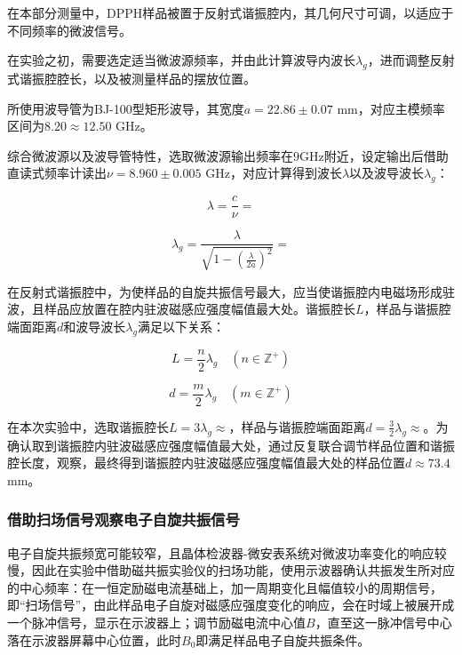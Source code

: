 \documentclass{thuemp}
\begin{document}
在本部分测量中，DPPH样品被置于反射式谐振腔内，其几何尺寸可调，以适应于不同频率的微波信号。

在实验之初，需要选定适当微波源频率，并由此计算波导内波长$\lambda_g$，进而调整反射式谐振腔腔长，以及被测量样品的摆放位置。

所使用波导管为BJ-100型矩形波导，其宽度$a=22.86\pm0.07$ \si{\milli\meter}，对应主模频率区间为$8.20 \approx 12.50$ \si{\giga\hertz}。

综合微波源以及波导管特性，选取微波源输出频率在$9$\si{\giga\hertz}附近，设定输出后借助直读式频率计读出$\nu  = 8.960 \pm 0.005$ \si{\giga\hertz}，对应计算得到波长$\lambda$以及波导波长$\lambda_g$：

\begin{equation}
\lambda = \frac{c}{\nu} = 
\end{equation}

\begin{equation}
\lambda_g = \frac{\lambda}{\sqrt{1 - \left(\frac{\lambda}{2a}\right)^2}} = 
\end{equation}

在反射式谐振腔中，为使样品的自旋共振信号最大，应当使谐振腔内电磁场形成驻波，且样品应放置在腔内驻波磁感应强度幅值最大处。谐振腔长$L$，样品与谐振腔端面距离$d$和波导波长$\lambda_g$满足以下关系：

\begin{equation}
L = \frac{n}{2}\lambda_g \quad (n \in \mathbb{Z}^+)
\end{equation}

\begin{equation}
d = \frac{m}{2}\lambda_g \quad (m \in \mathbb{Z}^+)
\end{equation}

在本次实验中，选取谐振腔长$L=3\lambda_g\approx$，样品与谐振腔端面距离$d=\frac{3}{2}\lambda_g\approx$。为确认取到谐振腔内驻波磁感应强度幅值最大处，通过反复联合调节样品位置和谐振腔长度，观察，最终得到谐振腔内驻波磁感应强度幅值最大处的样品位置$d \approx 73.4 $\si{\milli\meter}。

\subsubsection{借助扫场信号观察电子自旋共振信号}

电子自旋共振频宽可能较窄，且晶体检波器-微安表系统对微波功率变化的响应较慢，因此在实验中借助磁共振实验仪的扫场功能，使用示波器确认共振发生所对应的中心频率：在一恒定励磁电流基础上，加一周期变化且幅值较小的周期信号，即“扫场信号”，由此样品电子自旋对磁感应强度变化的响应，会在时域上被展开成一个脉冲信号，显示在示波器上；调节励磁电流中心值$B$，直至这一脉冲信号中心落在示波器屏幕中心位置，此时$B_0$即满足样品电子自旋共振条件。
\end{document}

